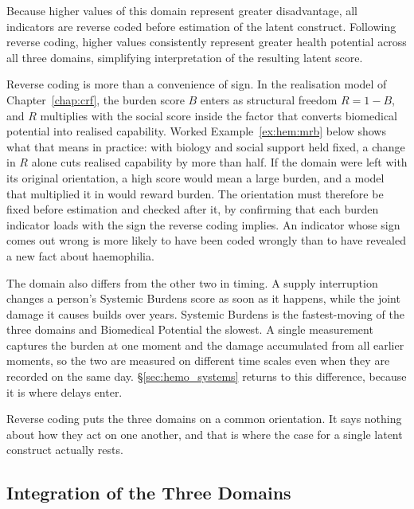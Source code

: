 Because higher values of this domain represent greater disadvantage, all indicators are reverse coded before estimation of the latent construct. Following reverse coding, higher values consistently represent greater health potential across all three domains, simplifying interpretation of the resulting latent score.

Reverse coding is more than a convenience of sign. In the realisation model of Chapter~\ref{chap:crf}, the burden score $B$ enters as structural freedom $R=1-B$, and $R$ multiplies with the social score inside the factor that converts biomedical potential into realised capability. Worked Example~\ref{ex:hem:mrb} below shows what that means in practice: with biology and social support held fixed, a change in $R$ alone cuts realised capability by more than half. If the domain were left with its original orientation, a high score would mean a large burden, and a model that multiplied it in would reward burden. The orientation must therefore be fixed before estimation and checked after it, by confirming that each burden indicator loads with the sign the reverse coding implies. An indicator whose sign comes out wrong is more likely to have been coded wrongly than to have revealed a new fact about haemophilia.

The domain also differs from the other two in timing. A supply interruption changes a person's Systemic Burdens score as soon as it happens, while the joint damage it causes builds over years. Systemic Burdens is the fastest-moving of the three domains and Biomedical Potential the slowest. A single measurement captures the burden at one moment and the damage accumulated from all earlier moments, so the two are measured on different time scales even when they are recorded on the same day. \S\ref{sec:hemo_systems} returns to this difference, because it is where delays enter.

Reverse coding puts the three domains on a common orientation. It says
nothing about how they act on one another, and that is where the case for a
single latent construct actually rests.

\subsection{Integration of the Three Domains}

